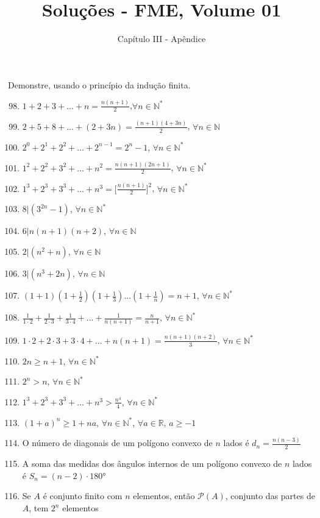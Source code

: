 \documentclass[12pt, openright, a4paper, twoside, english, brazil]{article}
\title{Soluções - FME, Volume 01}
\author{Capítulo III - Apêndice}
\date{}
\newcommand{\forallN}{$\forall n\in \mathbb N$}
\newcommand{\forallNp}{$\forall n\in \mathbb N^*$}
\begin{document}
\maketitle

Demonstre, usando o princípio da indução finita.

\begin{enumerate}[\bfseries 1.]
    \setcounter{enumi}{97}
  \item $1+2+3+...+n=\frac{n(n+1)}{2}$,\forallNp
  \item $2+5+8+...+(2+3n)=\frac{(n+1)(4+3n)}{2}$, \forallN
  \item $2^0+2^1+2^2+...+2^{n-1}=2^n-1$, \forallNp
  \item $1^2+2^2+3^2+...+n^2=\frac{n(n+1)(2n+1)}{2}$, \forallNp
  \item $1^3+2^3+3^3+...+n^3=\lbrack \frac{n(n+1)}{2}\rbrack^2$, \forallNp
  \item $8|(3^{2n}-1)$, \forallNp
  \item $6|n(n+1)(n+2)$, \forallN
  \item $2|(n^2+n)$, \forallN
  \item $3|(n^3+2n)$, \forallN
  \item $(1+1)(1+\frac 1 2)(1+\frac 1 3)...(1+\frac 1 n)=n+1$, \forallNp
  \item $\frac{1}{1\cdot 2}+\frac{1}{2\cdot 3}+\frac{1}{3\cdot
    4}+...+\frac{1}{n(n+1)}=\frac{n}{n+1}$, \forallNp
  \item $1\cdot 2+2\cdot 3+3\cdot 4+...+n(n+1)=\frac{n(n+1)(n+2)}{3}$, \forallNp
  \item $2n\ge n+1$, \forallNp
  \item $2^n>n$, \forallNp
  \item $1^3+2^3+3^3+...+n^3>\frac{n^4}{4}$, \forallNp
  \item $(1+a)^n\ge1+na$, \forallNp, $\forall a\in \mathbb R$, $a\ge-1$
  \item O número de diagonais de um polígono convexo de $n$ lados é
    $d_n=\frac{n(n-3)}{2}$
  \item A soma das medidas dos ângulos internos de um polígono
    convexo de $n$ lados é $S_n=(n-2)\cdot 180$°
  \item Se $A$ é conjunto finito com $n$ elementos, então $\mathcal P(A)$,
    conjunto das partes de $A$, tem $2^n$ elementos
\end{enumerate}
\end{document}
